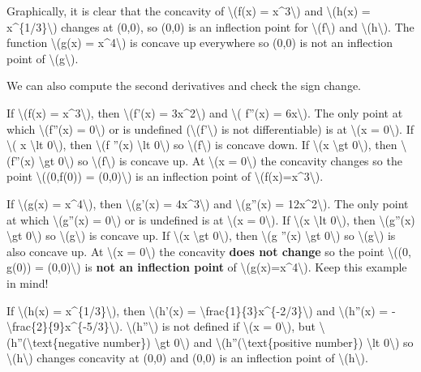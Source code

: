 Graphically, it is clear that the concavity of \textbackslash{}(f(x) =
x\^{}3\textbackslash{}) and \textbackslash{}(h(x) =
x\^{}\{1/3\}\textbackslash{}) changes at (0,0), so (0,0) is an
inflection point for \textbackslash{}(f\textbackslash{}) and
\textbackslash{}(h\textbackslash{}). The function \textbackslash{}(g(x)
= x\^{}4\textbackslash{}) is concave up everywhere so (0,0) is not an
inflection point of \textbackslash{}(g\textbackslash{}).

We can also compute the second derivatives and check the sign change.

If \textbackslash{}(f(x) = x\^{}3\textbackslash{}), then
\textbackslash{}(f'(x) = 3x\^{}2\textbackslash{}) and \textbackslash{}(
f''(x) = 6x\textbackslash{}). The only point at which
\textbackslash{}(f''(x) = 0\textbackslash{}) or is undefined
(\textbackslash{}(f'\textbackslash{}) is not differentiable) is at
\textbackslash{}(x = 0\textbackslash{}). If \textbackslash{}( x
\textbackslash{}lt 0\textbackslash{}), then \textbackslash{}(f ''(x)
\textbackslash{}lt 0\textbackslash{}) so
\textbackslash{}(f\textbackslash{}) is concave down. If
\textbackslash{}(x \textbackslash{}gt 0\textbackslash{}), then
\textbackslash{}(f''(x) \textbackslash{}gt 0\textbackslash{}) so
\textbackslash{}(f\textbackslash{}) is concave up. At \textbackslash{}(x
= 0\textbackslash{}) the concavity changes so the point
\textbackslash{}((0,f(0)) = (0,0)\textbackslash{}) is an inflection
point of \textbackslash{}(f(x)=x\^{}3\textbackslash{}).

If \textbackslash{}(g(x) = x\^{}4\textbackslash{}), then
\textbackslash{}(g'(x) = 4x\^{}3\textbackslash{}) and
\textbackslash{}(g''(x) = 12x\^{}2\textbackslash{}). The only point at
which \textbackslash{}(g''(x) = 0\textbackslash{}) or is undefined is at
\textbackslash{}(x = 0\textbackslash{}). If \textbackslash{}(x
\textbackslash{}lt 0\textbackslash{}), then \textbackslash{}(g''(x)
\textbackslash{}gt 0\textbackslash{}) so
\textbackslash{}(g\textbackslash{}) is concave up. If \textbackslash{}(x
\textbackslash{}gt 0\textbackslash{}), then \textbackslash{}(g ''(x)
\textbackslash{}gt 0\textbackslash{}) so
\textbackslash{}(g\textbackslash{}) is also concave up. At
\textbackslash{}(x = 0\textbackslash{}) the concavity \textbf{does not
change} so the point \textbackslash{}((0, g(0)) = (0,0)\textbackslash{})
is \textbf{not an inflection point} of
\textbackslash{}(g(x)=x\^{}4\textbackslash{}). Keep this example in
mind!

If \textbackslash{}(h(x) = x\^{}\{1/3\}\textbackslash{}), then
\textbackslash{}(h'(x) =
\textbackslash{}frac\{1\}\{3\}x\^{}\{-2/3\}\textbackslash{}) and
\textbackslash{}(h''(x) =
-\textbackslash{}frac\{2\}\{9\}x\^{}\{-5/3\}\textbackslash{}).
\textbackslash{}(h''\textbackslash{}) is not defined if
\textbackslash{}(x = 0\textbackslash{}), but
\textbackslash{}(h''(\textbackslash{}text\{negative number\})
\textbackslash{}gt 0\textbackslash{}) and
\textbackslash{}(h''(\textbackslash{}text\{positive number\})
\textbackslash{}lt 0\textbackslash{}) so
\textbackslash{}(h\textbackslash{}) changes concavity at (0,0) and (0,0)
is an inflection point of \textbackslash{}(h\textbackslash{}).

